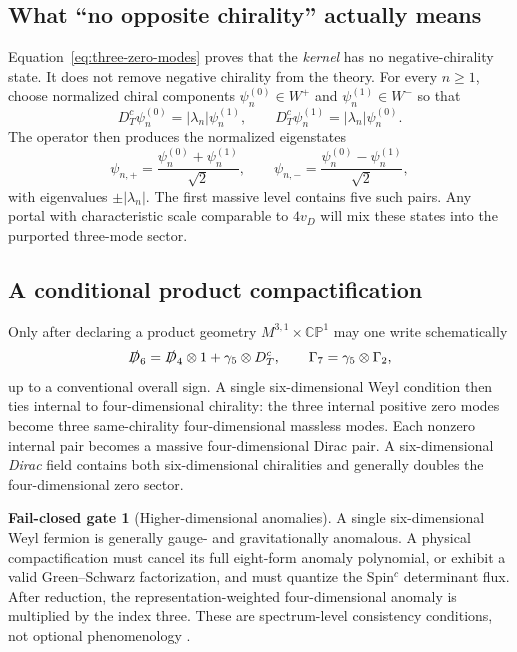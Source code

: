 \documentclass[11pt]{article}
\theoremstyle{definition}
\newtheorem{gate}[theorem]{Fail-closed gate}
\theoremstyle{remark}
\newcommand{\CP}{\mathbb {CP}}
\begin{document}
\subsection{What ``no opposite chirality'' actually means}

Equation~\eqref{eq:three-zero-modes} proves that the \emph{kernel} has no
negative-chirality state.  It does not remove negative chirality from the
theory.  For every \(n\ge1\), choose normalized chiral components
\(\psi_n^{(0)}\in W^+\) and \(\psi_n^{(1)}\in W^-\) so that
\begin{equation}
 D_T^c\psi_n^{(0)}=|\lambda_n|\psi_n^{(1)},\qquad
 D_T^c\psi_n^{(1)}=|\lambda_n|\psi_n^{(0)}.
 \label{eq:chiral-component-pair}
\end{equation}
The operator then produces the normalized eigenstates
\begin{equation}
 \psi_{n,+}=\frac{\psi_n^{(0)}+\psi_n^{(1)}}{\sqrt2},\qquad
 \psi_{n,-}=\frac{\psi_n^{(0)}-\psi_n^{(1)}}{\sqrt2},
 \label{eq:massive-pairs}
\end{equation}
with eigenvalues \(\pm|\lambda_n|\).  The first massive level contains five
such pairs.  Any portal with characteristic scale comparable to \(4v_D\) will
mix these states into the purported three-mode sector.

\subsection{A conditional product compactification}

Only after declaring a product geometry \(M^{3,1}\times\CP^1\) may one write
schematically
\begin{equation}
 \slashed D_6=\slashed D_4\otimes1
 +\gamma_5\otimes D_T^c,
 \qquad
 \Gamma_7=\gamma_5\otimes\Gamma_2,
 \label{eq:product-dirac}
\end{equation}
up to a conventional overall sign.  A single six-dimensional Weyl condition
then ties internal to four-dimensional chirality: the three internal
positive zero modes become three same-chirality four-dimensional massless
modes.  Each nonzero internal pair becomes a massive four-dimensional Dirac
pair.  A six-dimensional \emph{Dirac} field contains both six-dimensional
chiralities and generally doubles the four-dimensional zero sector.

\begin{gate}[Higher-dimensional anomalies]
A single six-dimensional Weyl fermion is generally gauge- and
gravitationally anomalous.  A physical compactification must cancel its full
eight-form anomaly polynomial, or exhibit a valid Green--Schwarz
factorization, and must quantize the Spin\({}^c\) determinant flux.  After
reduction, the representation-weighted four-dimensional anomaly is multiplied
by the index three.  These are spectrum-level consistency conditions, not
optional phenomenology \cite{AlvarezGaumeWitten1984}.
\end{gate}
\end{document}
